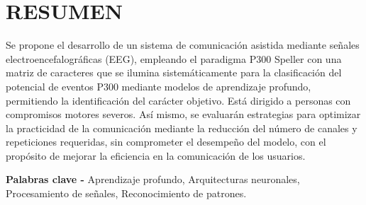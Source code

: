 \chapter*{RESUMEN}

Se propone el desarrollo de un sistema de comunicación asistida mediante señales
electroencefalográficas (EEG), empleando el paradigma P300 Speller con una matriz de
caracteres que se ilumina sistemáticamente para la clasificación del potencial de eventos
P300 mediante modelos de aprendizaje profundo, permitiendo la identificación del carácter
objetivo. Está dirigido a personas con compromisos motores severos. Así mismo, se
evaluarán estrategias para optimizar la practicidad de la comunicación mediante la
reducción del número de canales y repeticiones requeridas, sin comprometer el desempeño
del modelo, con el propósito de mejorar la eficiencia en la comunicación de los usuarios.

\vspace{0.3cm}
\noindent\textbf{Palabras clave -} Aprendizaje profundo, Arquitecturas neuronales,
Procesamiento de señales, Reconocimiento de patrones.
